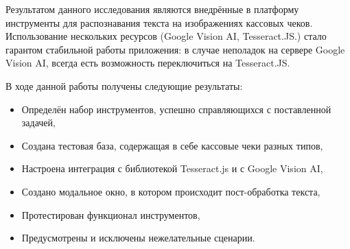 \documentclass[14pt]{mmcs_article}
\begin{document}
Результатом данного исследования являются внедрённые в платформу инструменты для распознавания текста на изображениях кассовых чеков. Использование нескольких ресурсов (Google Vision AI, Tesseract.\-JS.) стало гарантом стабильной работы приложения: в случае неполадок на сервере Google Vision AI, всегда есть возможность переключиться на Tesseract.\-JS.

В ходе данной работы получены следующие результаты: 
\begin{itemize}
\item Определён набор инструментов, успешно справляющихся с поставленной задачей,
\item Создана тестовая база, содержащая в себе кассовые чеки разных типов,
\item Настроена интеграция с библиотекой Tesseract.js и с Google Vision AI,
\item Создано модальное окно, в котором происходит пост-обработка текста,
\item Протестирован функционал инструментов,
\item Предусмотрены и исключены нежелательные сценарии.
\end{itemize}
\newpage

\renewcommand{\refname}{\centering \textbf{Литература}}
\end{document}
